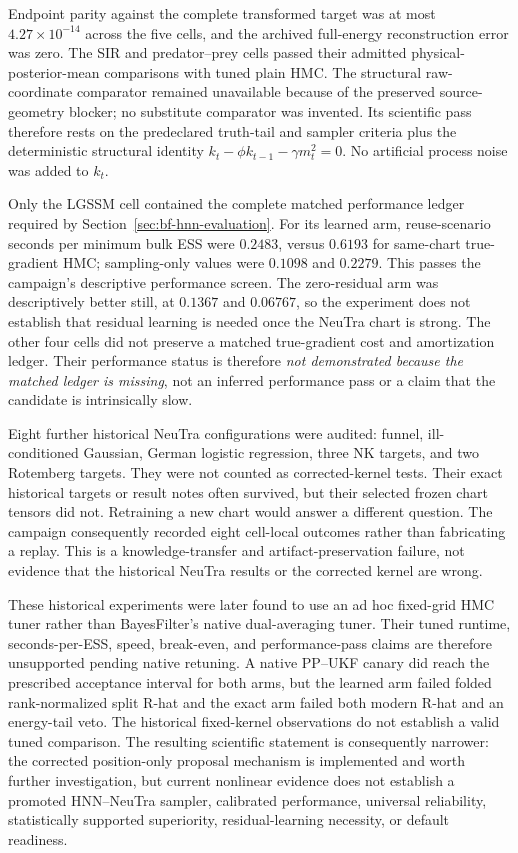 Endpoint parity against the complete transformed target was at most
$4.27\times10^{-14}$ across the five cells, and the archived full-energy
reconstruction error was zero.  The SIR and predator--prey cells passed their
admitted physical-posterior-mean comparisons with tuned plain HMC.  The
structural raw-coordinate comparator remained unavailable because of the
preserved source-geometry blocker; no substitute comparator was invented.  Its
scientific pass therefore rests on the predeclared truth-tail and sampler
criteria plus the deterministic structural identity
$k_t-\phi k_{t-1}-\gamma m_t^2=0$.  No artificial process noise was added to
$k_t$.

Only the LGSSM cell contained the complete matched performance ledger required
by Section~\ref{sec:bf-hnn-evaluation}.  For its learned arm, reuse-scenario
seconds per minimum bulk ESS were $0.2483$, versus $0.6193$ for same-chart
true-gradient HMC; sampling-only values were $0.1098$ and $0.2279$.  This passes
the campaign's descriptive performance screen.  The zero-residual arm was
descriptively better still, at $0.1367$ and $0.06767$, so the experiment does
not establish that residual learning is needed once the NeuTra chart is strong.
The other four cells did not preserve a matched true-gradient cost and
amortization ledger.  Their performance status is therefore \emph{not
demonstrated because the matched ledger is missing}, not an inferred
performance pass or a claim that the candidate is intrinsically slow.

Eight further historical NeuTra configurations were audited: funnel,
ill-conditioned Gaussian, German logistic regression, three NK targets, and
two Rotemberg targets.  They were not counted as corrected-kernel tests.  Their
exact historical targets or result notes often survived, but their selected
frozen chart tensors did not.  Retraining a new chart would answer a different
question.  The campaign consequently recorded eight cell-local
 outcomes rather than fabricating a replay.
This is a knowledge-transfer and artifact-preservation failure, not evidence
that the historical NeuTra results or the corrected kernel are wrong.

These historical experiments were later found to use an ad hoc fixed-grid HMC
tuner rather than BayesFilter's native dual-averaging tuner.  Their tuned
runtime, seconds-per-ESS, speed, break-even, and performance-pass claims are
therefore unsupported pending native retuning.  A native PP--UKF canary did
reach the prescribed acceptance interval for both arms, but the learned arm
failed folded rank-normalized split R-hat and the exact arm failed both modern
R-hat and an energy-tail veto.  The historical fixed-kernel observations do
not establish a valid tuned comparison.  The resulting scientific statement
is consequently narrower: the corrected position-only proposal mechanism is
implemented and worth further investigation, but current nonlinear evidence
does not establish a promoted HNN--NeuTra sampler, calibrated performance,
universal reliability, statistically supported superiority,
residual-learning necessity, or default readiness.

